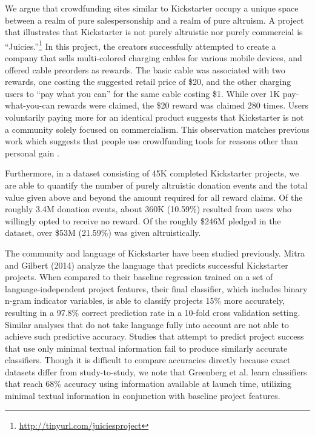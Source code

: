 \documentclass[letterpaper]{article}
\begin{document}
We argue that crowdfunding sites similar to Kickstarter occupy a unique space between a realm of pure salespersonship and a realm of pure altruism. A project that illustrates that Kickstarter is not purely altruistic nor purely commercial is ``Juicies.''\footnote{\url{http://tinyurl.com/juiciesproject}} In this project, the creators successfully attempted to create a company that sells multi-colored charging cables for various mobile devices, and offered cable preorders as rewards. The basic cable was associated with two rewards, one costing the suggested retail price of \$20, and the other charging users to ``pay what you can'' for the same cable costing \$1. While over 1K pay-what-you-can rewards were claimed, the \$20 reward was claimed 280 times. Users voluntarily paying more for an identical product suggests that Kickstarter is not a community solely focused on commercialism. This observation matches previous work which suggests that people use crowdfunding tools for reasons other than personal gain \cite{van2011fighting}.

Furthermore, in a dataset consisting of 45K completed Kickstarter projects, we are able to quantify the number of purely altruistic donation events and the total value given above and beyond the amount required for all reward claims. Of the roughly 3.4M donation events, about 360K (10.59\%) resulted from users who willingly opted to receive no reward. Of the roughly \$246M pledged in the dataset, over \$53M (21.59\%) was given altruistically.

The community and language of Kickstarter have been studied previously. Mitra and Gilbert (2014) analyze the language that predicts successful Kickstarter projects. When compared to their baseline regression trained on a set of language-independent project features, their final classifier, which includes binary n-gram indicator variables, is able to classify projects 15\% more accurately, resulting in a 97.8\% correct prediction rate in a 10-fold cross validation setting. Similar analyses that do not take language fully into account are not able to achieve such predictive accuracy. Studies that attempt to predict project success that use only minimal textual information fail to produce similarly accurate classifiers. Though it is difficult to compare accuracies directly because exact datasets differ from study-to-study, we note that Greenberg et al.  learn classifiers that reach 68\% accuracy using information available at launch time, utilizing minimal textual information in conjunction with baseline project features.
\end{document}
